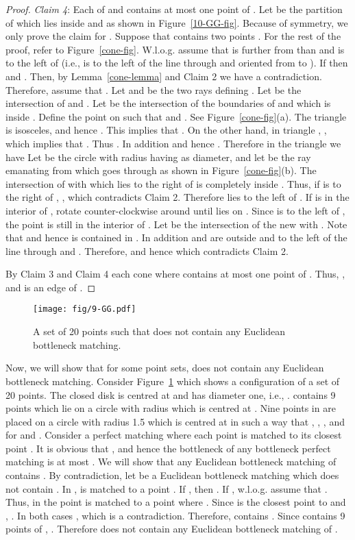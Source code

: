 \documentclass[11pt,a4paper]{article}
\newcommand{\kGG}[2]{}
\begin{document}
\begin{proof}
{\em Claim 4}: Each of  and  contains at most one point of . Let  be the partition of  which lies inside  and  as shown in Figure~\ref{10-GG-fig}. Because of symmetry, we only prove the claim for . Suppose that  contains two points .
For the rest of the proof, refer to Figure~\ref{cone-fig}. 
W.l.o.g. assume that  is further from  than  and  is to the left of  (i.e.,  is to the left of the line through
 and  oriented from  to ). If  then  and . Then, by Lemma~\ref{cone-lemma} and Claim 2 we have a contradiction. Therefore, assume that . Let  and  be the two rays defining . Let  be the intersection of  and . Let  be the intersection of the boundaries of  and  which is inside . Define the point  on  such that  and . See Figure~\ref{cone-fig}(a). The triangle  is isosceles, and hence . This implies that . On the other hand, in triangle , , which implies that . Thus . In addition  and hence . Therefore in the triangle  we have  Let  be the circle with radius  having  as diameter, and let  be the ray emanating from  which goes through  as shown in Figure~\ref{cone-fig}(b). The intersection of  with  which lies to the right of  is completely inside . Thus, if  is to the right of , , which contradicts Claim 2. Therefore  lies to the left of . If  is in the interior of , rotate  counter-clockwise around  until  lies on . Since  is to the left of , the point  is still in the interior of . Let  be the intersection of the new  with . Note that  and hence  is contained in . In addition  and  are outside  and to the left of the line through  and . Therefore,  and hence  which contradicts Claim 2. 

By Claim 3 and Claim 4 each cone  where  contains at most one point of . Thus, , and  is an edge of \kGG{10}{}.
\end{proof}

\begin{figure}[htb]
  \centering
  \texttt{[image: fig/9-GG.pdf]}
 \caption{A set of 20 points such that \kGG{8}{} does not contain any Euclidean bottleneck matching.}
  \label{8-GG-fig}
\end{figure}
Now, we will show that for some point sets, \kGG{8}{} does not contain any Euclidean bottleneck matching.
Consider Figure~\ref{8-GG-fig} which shows a configuration of a set  of 20 points. The closed disk  is centred at  and has diameter one, i.e., .  contains 9 points  which lie on a circle with radius  which is centred at . Nine points in  are placed on a circle with radius 1.5 which is centred at  in such a way that , , , and  for  and . Consider a perfect matching  where each point  is matched to its closest point . It is obvious that , and hence the bottleneck of any bottleneck perfect matching is at most . We will show that any Euclidean bottleneck matching of  contains . By contradiction, let  be a Euclidean bottleneck matching which does not contain . In ,  is matched to a point . If , then . If , w.l.o.g. assume that . Thus, in  the point  is matched to a point  where . Since  is the closest point to  and , . In both cases , which is a contradiction. Therefore,  contains . Since  contains 9 points of , . Therefore \kGG{8}{} does not contain any Euclidean bottleneck matching of . 
\end{document}
